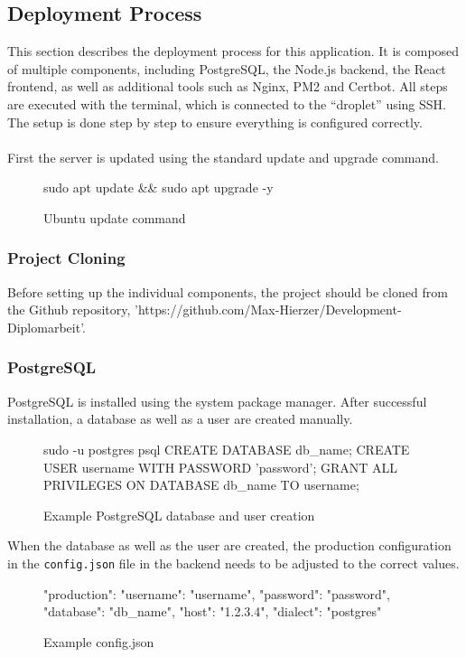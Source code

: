 \documentclass[a4paper,12pt]{report}
\begin{document}
\subsection{Deployment Process}
This section describes the deployment process for this application. It is composed of multiple components, including PostgreSQL, the Node.js backend, the React frontend, as well as additional tools such as Nginx, PM2 and Certbot. All steps are executed with the terminal, which is connected to the “droplet” using SSH. The setup is done step by step to ensure everything is configured correctly.\\\\
First the server is updated using the standard update and upgrade command.
\begin{figure}[H]
	\begin{terminal}
		sudo apt update && sudo apt upgrade -y
	\end{terminal}
	\caption{Ubuntu update command}
\end{figure}
\subsubsection{Project Cloning}
Before setting up the individual components, the project should be cloned from the Github repository, 'https://github.com/Max-Hierzer/Development-Diplomarbeit'.
\subsubsection{PostgreSQL}
PostgreSQL is installed using the system package manager. After successful installation, a database as well as a user are created manually.
\begin{figure}[H]
	\begin{terminal}
		sudo -u postgres psql
		CREATE DATABASE db_name;
		CREATE USER username WITH PASSWORD 'password';
		GRANT ALL PRIVILEGES ON DATABASE db_name TO username;
		\q
	\end{terminal}
	\caption{Example PostgreSQL database and user creation}
\end{figure}
\noindent
When the database as well as the user are created, the production configuration in the \texttt{config.json} file in the backend needs to be adjusted to the correct values.
\begin{figure}[H]
	\begin{terminal}
		"production": {
			"username": "username",
			"password": "password",
			"database": "db_name",
			"host": "1.2.3.4",
			"dialect": "postgres"
		}
	\end{terminal}
	\caption{Example config.json}
\end{figure}
\end{document}
